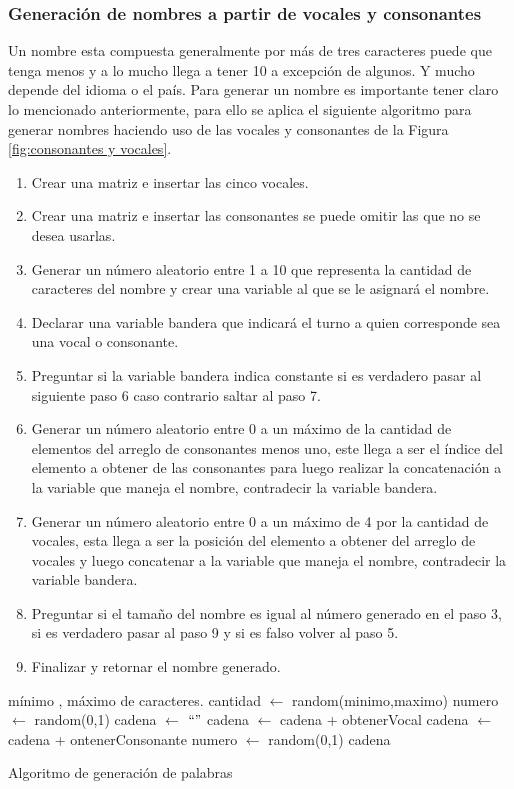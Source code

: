 \subsubsection{Generaci\'on de nombres a partir de vocales y consonantes}
Un nombre esta compuesta generalmente por m\'as de tres caracteres puede que tenga menos y a lo mucho llega a tener 10 a excepci\'on de algunos. Y mucho depende del idioma o el pa\'is.
Para generar un nombre es importante tener claro lo mencionado anteriormente, para ello se aplica el siguiente algoritmo para generar nombres haciendo uso de las vocales y consonantes de la Figura \ref{fig:consonantes y vocales}.
\begin{enumerate}
\item Crear una matriz e insertar las cinco vocales.
\item Crear una matriz e insertar las consonantes se puede omitir las que no se desea usarlas.
\item Generar un n\'umero aleatorio entre 1 a 10 que representa la cantidad de caracteres del nombre y crear una variable al que se le asignar\'a el nombre.
\item Declarar una variable bandera que indicar\'a el turno a quien corresponde sea una vocal o consonante.
\item Preguntar si la variable bandera indica constante si es verdadero pasar al siguiente paso 6 caso contrario saltar al paso 7.
\item Generar un n\'umero aleatorio entre 0 a un m\'aximo de la cantidad de elementos del arreglo de consonantes menos uno, este llega a ser el \'indice del elemento a obtener de las consonantes para luego realizar la concatenaci\'on a la variable que maneja el nombre, contradecir la variable bandera.
\item Generar un n\'umero aleatorio entre 0 a un m\'aximo de 4 por la cantidad de vocales, esta llega a ser la posici\'on del elemento a obtener del arreglo de vocales y luego concatenar a la variable que maneja el nombre, contradecir la variable bandera.
\item Preguntar si el tama\~no del nombre es igual al n\'umero generado en el paso 3, si es verdadero pasar al paso 9 y si es falso volver al paso 5.
\item Finalizar y retornar el nombre generado. 
\end{enumerate}
\begin{algorithm}[H]
\begin{algorithmic}[1]
\REQUIRE m\'inimo , m\'aximo de caracteres.
\STATE cantidad $\leftarrow$ random(minimo,maximo)
\STATE numero $\leftarrow$ random(0,1)
\STATE cadena $\leftarrow$ $`` "$
\STATE cadena $\leftarrow$ cadena + obtenerVocal
\ELSE
\STATE cadena $\leftarrow$ cadena + ontenerConsonante
\ENDIF
\STATE numero $\leftarrow$ random(0,1)
\ENDWHILE
\RETURN cadena
\end{algorithmic}
\caption{Algoritmo de generaci\'on de palabras}\label{alg:algoritmoGeneracionPalabras}
\end{algorithm}
